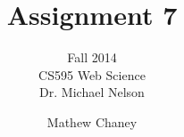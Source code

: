 \documentclass[10pt,letterpaper,bibliography=totocnumbered]{scrartcl}
\begin{document}
\author{Mathew Chaney}
\title{Assignment 7}
\subtitle{Fall 2014\\ CS595 Web Science\\ Dr. Michael Nelson}
\maketitle
\newpage

\tableofcontents
\listoffigures
\lstlistoflistings





\end{document}
